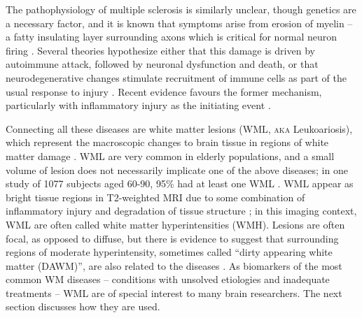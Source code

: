 \par
The pathophysiology of multiple sclerosis is similarly unclear, though genetics are a necessary factor, and it is known that symptoms arise from erosion of myelin -- a fatty insulating layer surrounding axons which is critical for normal neuron firing \cite{Trapp2008}. Several theories hypothesize either that this damage is driven by autoimmune attack, followed by neuronal dysfunction and death, or that neurodegenerative changes stimulate recruitment of immune cells as part of the usual response to injury \cite{Lucchinetti2000,Trapp2008}. Recent evidence favours the former mechanism, particularly with inflammatory injury as the initiating event \cite{Ciccarelli2014,Mahad2015}.
\par
Connecting all these diseases are white matter lesions (WML, \textsc{aka} Leukoariosis), which represent the macroscopic changes to brain tissue in regions of white matter damage \cite{Debette2010,Bakshi2005,Wardlaw2015}. WML are very common in elderly populations, and a small volume of lesion does not necessarily implicate one of the above diseases; in one study of 1077 subjects aged 60-90, 95\% had at least one WML \cite{DeLeeuw2001}. WML appear as bright tissue regions in T2-weighted MRI due to some combination of inflammatory injury and degradation of tissue structure \cite{Bakshi2005,Wardlaw2015}; in this imaging context, WML are often called white matter hyperintensities (WMH). Lesions are often focal, as opposed to diffuse, but there is evidence to suggest that surrounding regions of moderate hyperintensity, sometimes called ``dirty appearing white matter (DAWM)'', are also related to the diseases \cite{Ge2003}. As biomarkers of the most common WM diseases -- conditions with unsolved etiologies and inadequate treatments -- WML are of special interest to many brain researchers. The next section discusses how they are used.
